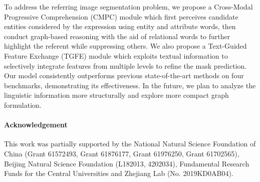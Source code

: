 \documentclass[10pt,twocolumn,letterpaper]{article}
\begin{document}
To address the referring image segmentation problem, we propose a Cross-Modal Progressive Comprehension (CMPC) module which first perceives candidate entities considered by the expression using entity and attribute words, then conduct graph-based reasoning with the aid of relational words to further highlight the referent while suppressing others. 
We also propose a Text-Guided Feature Exchange (TGFE) module which exploits textual information to selectively integrate features from multiple levels to refine the mask prediction. 
Our model consistently outperforms previous state-of-the-art methods on four benchmarks, demonstrating its effectiveness. 
In the future, we plan to analyze the linguistic information more structurally and explore more compact graph formulation.

\vspace{-5mm}
\paragraph{Acknowledgement} This work was partially supported by the National Natural Science Foundation of China (Grant 61572493, Grant 61876177, Grant 61976250, Grant 61702565), Beijing Natural Science Foundation (L182013, 4202034), Fundamental Research Funds for the Central Universities and Zhejiang Lab (No. 2019KD0AB04).

{\small


}
\end{document}
